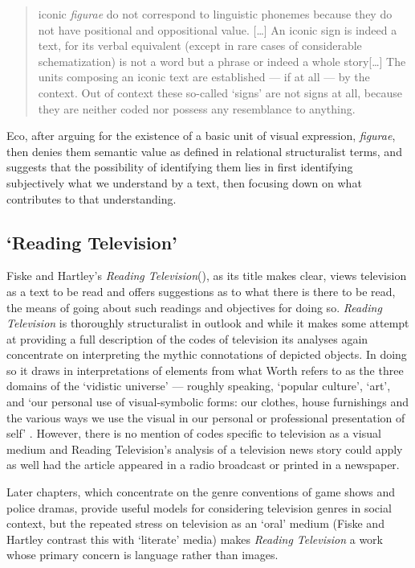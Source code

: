 \begin{quote}
iconic \textit{figurae} do not correspond to linguistic phonemes because they do not have positional and oppositional value. [\ldots] An iconic sign is indeed a text, for its verbal equivalent (except in rare cases of considerable schematization) is not a word but a phrase or indeed a whole story[\ldots] The units composing an iconic text are established --- if at all --- by the context. Out of context these so-called `signs' are not signs at all, because they are neither coded nor possess any resemblance to anything. \citep[215-6]{Eco:1976}
\end{quote}

Eco, after arguing for the existence of a basic unit of visual expression, \emph{figurae}, then denies them semantic value as defined in relational structuralist terms, and suggests that the possibility of identifying them lies in first identifying subjectively what we understand by a text, then focusing down on what contributes to that understanding. 

\subsection{`Reading Television'} %
Fiske and Hartley's \textit{Reading Television}(\citeyear{Fiske:1978}), as its title makes clear, views television as a text to be read and offers suggestions as to what there is there to be read, the means of going about such readings and objectives for doing so. \textit{Reading Television} is thoroughly structuralist in outlook and while it makes some attempt at providing a full description of the codes of television its analyses again concentrate on interpreting the mythic connotations of depicted objects. In doing so it draws in interpretations of elements from what Worth refers to as the three domains of the `vidistic universe' --- roughly speaking, `popular culture', `art', and `our personal use of visual-symbolic forms: our clothes, house furnishings and the various ways we use the visual in our personal or professional presentation of self' \citep[201]{Worth:1981}. However, there is no mention of codes specific to television as a visual medium and Reading Television's analysis of a television news story could apply as well had the article appeared in a radio broadcast or printed in a newspaper.

Later chapters, which concentrate on the genre conventions of game shows and police dramas, provide useful models for considering television genres in social context, but the repeated stress on television as an `oral' medium (Fiske and Hartley contrast this with `literate' media) makes \textit{Reading Television} a work whose primary concern is language rather than images.
 
